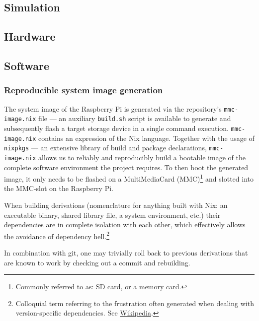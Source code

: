 \subsection{Simulation}

\subsection{Hardware}

\subsection{Software}
\subsubsection{Reproducible system image generation}
The system image of the Raspberry Pi is generated via the repository's \texttt{mmc-image.nix} file ---
an auxiliary \texttt{build.sh} script is available to generate and subsequently flash a target storage device in a single command execution.
\texttt{mmc-image.nix} contains an expression of the Nix language.
Together with the usage of \texttt{nixpkgs} --- an extensive library of build and package declarations,
\texttt{mmc-image.nix} allows us to reliably and reproducibly build a bootable image of the complete software environment the project requires.
To then boot the generated image, it only needs to be flashed on a MultiMediaCard (MMC)\footnote{Commonly referred to as: SD card, or a memory card.} and slotted into the MMC-slot on the Raspberry Pi.

When building derivations (nomenclature for anything built with Nix: an executable binary, shared library file, a system environment, etc.) their dependencies are in complete isolation with each other, which effectively allows the avoidance of dependency hell.\footnote{Colloquial term referring to the frustration often generated when dealing with version-specific dependencies.
See \href{https://en.wikipedia.org/wiki/Dependency_hell}{Wikipedia}.}

In combination with git, one may trivially roll back to previous derivations that are known to work by checking out a commit and rebuilding.

